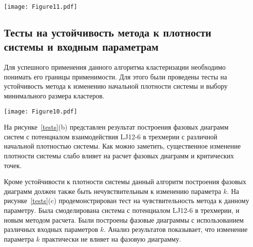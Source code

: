 \begin{figure*}[!t]
    \centering
    \texttt{[image: Figure11.pdf]}
    \caption{Фазовые диаграммы систем с различным дальнодействием притяжения.
    (a) Фазовые диаграммы в двумерных системах.
    (b) Фазовые диаграммы в трехмерных системах.}
    \label{phase_diagram}
\end{figure*}

\subsection{Тесты на устойчивость метода к плотности системы и входным параметрам}
\label{PRIMe-SubSecTests}


Для успешного применения данного алгоритма кластеризации необходимо понимать его границы применимости.
Для этого были проведены тесты на устойчивость метода к изменению начальной плотности системы и выбору минимального размера кластеров.

\begin{figure*}[!t]
    \centering
    \texttt{[image: Figure10.pdf]}
    \caption{\textbf{(a)} Сравнение различных методов построения фазовых диаграмм. Красным отмечен самый точный метод - термодинамическое интегрирование~\cite{10.1080/00268976.2019.1699185}.
             \textbf{(b)} Тест на влияние средней плотности на фазовую диаграмму системы LJ12-6 в трехмерии.
             \textbf{(c)} Тест на влияние начального параметра $k$ на фазовую диаграмму системы LJ12-6 в трехмерии.}
    \label{tests}
\end{figure*}



На рисунке~\ref{tests}(b) представлен результат построения фазовых диаграмм систем с потенциалом взаимодействия LJ12-6 в трехмерии с различной начальной плотностью системы. Как можно заметить, существенное изменение плотности системы слабо влияет на расчет фазовых диаграмм и критических точек.



Кроме устойчивости к плотности системы данный алгоритм построения фазовых диаграмм должен также быть нечувствительным к изменению параметра $k$.
На рисунке~\ref{tests}(c) продемонстрирован тест на чувствительность метода к данному параметру.
Была смоделирована система с потенциалом LJ12-6 в трехмерии, и новым методом расчета.
Были построены фазовые диаграммы с использованием различных входных параметров $k$.
Анализ результатов показывает, что изменение параметра $k$ практически не влияет на фазовую диаграмму.



